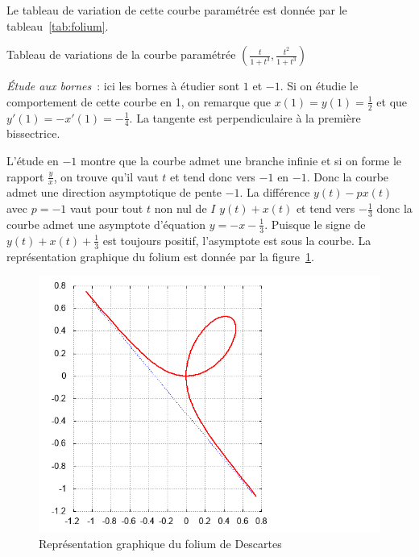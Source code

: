 Le tableau de variation de cette courbe paramétrée est donnée par le tableau~\ref{tab:folium}.

\begin{table}
\centering
\caption{Tableau de variations de la courbe paramétrée $\left(\frac{t}{1+t^3},\frac{t^2}{1+t^3}\right)$}
\label{tab:folium}
\end{table}

\emph{Étude aux bornes}~:
ici les bornes à étudier sont $1$ et $-1$. Si on étudie le comportement de cette courbe en 1, on remarque que $x(1)=y(1)=\frac{1}{2}$ et que $y'(1)=-x'(1)=-\frac{1}{4}$. La tangente est perpendiculaire à la première bissectrice.

L'étude en $-1$ montre que la courbe admet une branche infinie et si on forme le rapport $\frac{y}{x}$, on trouve qu'il vaut $t$ et tend donc vers $-1$ en $-1$. Donc la courbe admet une direction asymptotique de pente $-1$. La différence $y(t)-px(t)$ avec $p=-1$ vaut pour tout $t$ non nul de $I$ $y(t)+x(t)$ et tend vers $-\frac{1}{3}$ donc la courbe admet une asymptote d'équation $y=-x-\frac{1}{3}$. Puisque le signe de $y(t)+x(t)+\frac{1}{3}$ est toujours positif, l'asymptote est sous la courbe. La représentation graphique du folium est donnée par la figure~\ref{fig:folium}.
\begin{figure}
 \centering
 \includegraphics[scale=0.45, angle=-90]{folium.png}
 \caption{Représentation graphique du folium de Descartes}
 \label{fig:folium}
\end{figure}

